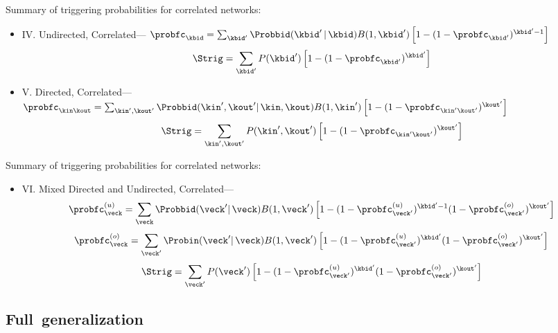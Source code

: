 \begin{frame}
  \small
  \begin{block}{Summary of triggering probabilities for correlated networks:}
    \begin{itemize}
    \item<1->
    IV. Undirected, Correlated---
    $
    \probfc_{\kbid} = 
    \sum_{\kbid'}
    \Probbid(\kbid'\, | \, \kbid)
    B(1,\kbid')
    \left[
      1
      -
      (1-\probfc_{\kbid'})^{\kbid'-1}
    \right]
    $
    $$
    \Strig
    =
    \sum_{\kbid'} 
    P(\kbid')
    \left[
      1 - (1-\probfc_{\kbid'})^{\kbid'}
    \right]
    $$
    \item<2->
    V. Directed, Correlated---
    $
    \probfc_{\kin\kout} = 
    \sum_{\kin',\kout'}
    \Probbid(\kin',\kout' | \, \kin,\kout)
    B(1,\kin')
    \left[
      1
      -
      (1-\probfc_{\kin'\kout'})^{\kout'}
    \right]
    $
    $$
    \Strig
    =
    \sum_{\kin',\kout'} 
    P(\kin',\kout')
    \left[
      1 - (1-\probfc_{\kin'\kout'})^{\kout'}
    \right]
    $$
    \end{itemize}
  \end{block}
\end{frame}


\begin{frame}
  \small
  \begin{block}{Summary of triggering probabilities for correlated networks:}
    \begin{itemize}
    \item<1->
      VI. Mixed Directed and Undirected, Correlated---
      $$
      \probfc^{(u)}_{\veck} 
      = 
      \sum_{\veck}
      \Probbid(\veck' | \, \veck)
      B(1,\veck')
      \left[
        1
        -
        (1-\probfc^{(u)}_{\veck'})^{\kbid'-1}
        (1-\probfc^{(o)}_{\veck'})^{\kout'}
      \right]
      $$
      $$
      \probfc^{(o)}_{\veck} 
      = 
      \sum_{\veck'}
      \Probin(\veck' | \, \veck)
      B(1,\veck')
      \left[
        1
        -
        (1-\probfc^{(u)}_{\veck'})^{\kbid'}
        (1-\probfc^{(o)}_{\veck'})^{\kout'}
      \right]
      $$
      $$
      \Strig
      =
      \sum_{\veck'} 
      P(\veck')
      \left[
        1 - (1-\probfc^{(u)}_{\veck'})^{\kbid'}
        (1-\probfc^{(o)}_{\veck'})^{\kout'}
      \right]
      $$
    \end{itemize}
  \end{block}
\end{frame}

\subsection{Full\ generalization}

